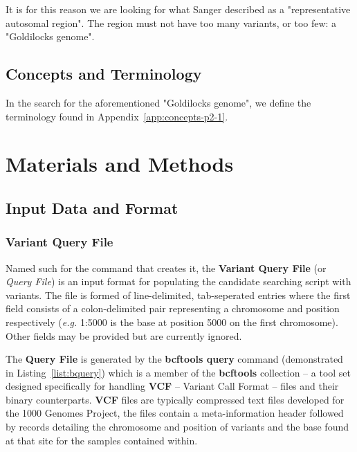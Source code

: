 It is for this reason we are looking for what Sanger described as a
"representative autosomal region". The region must not have too many
variants, or too few: a "Goldilocks genome".


\section{Concepts and Terminology}

In the search for the aforementioned "Goldilocks genome", we define the
terminology found in Appendix~\ref{app:concepts-p2-1}.



\chapter{Materials and Methods}
\section{Input Data and Format}
\label{chap:part2:input}

\subsection{Variant Query File}
\label{sec:vqf}

Named such for the command that creates it, the \textbf{Variant Query File} (or
\textit{Query File}) is an input format for populating the candidate searching
script with variants. The file is formed of line-delimited, tab-seperated
entries where the first field consists of a colon-delimited pair representing a
chromosome and position respectively (\textit{e.g.} 1:5000 is the base at
position 5000 on the first chromosome). Other fields may be provided but are
currently ignored.

The \textbf{Query File} is generated by the
\textbf{bcftools query}\citep{man:bcftools-query} command
(demonstrated in Listing~\ref{list:bquery}) which is a member of the
\textbf{bcftools} collection -- a tool set designed specifically for
handling \textbf{VCF} -- Variant Call Format\citep{vcf}\citep{vcft} --
files and their binary counterparts. \textbf{VCF} files are typically compressed
text files developed for the 1000 Genomes Project, the files contain a
meta-information header followed by records detailing the chromosome and
position of variants and the base found at that site for the samples contained
within.

